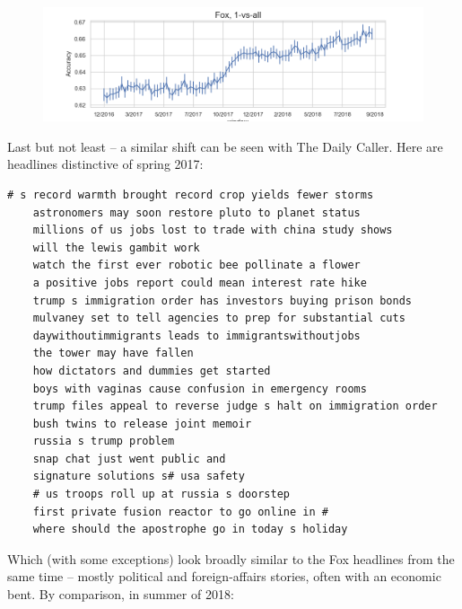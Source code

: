 \documentclass{scrartcl}
\begin{document}
\begin{figure}[H]
  \centering
  \includegraphics[width=\textwidth]{figures/ts-ova-fox.png}
\end{figure}

Last but not least -- a similar shift can be seen with The Daily Caller. Here are headlines distinctive of spring 2017:

\begin{lstlisting}[basicstyle=\tiny\hlfont]
    # s record warmth brought record crop yields fewer storms
    astronomers may soon restore pluto to planet status
    millions of us jobs lost to trade with china study shows
    will the lewis gambit work
    watch the first ever robotic bee pollinate a flower
    a positive jobs report could mean interest rate hike
    trump s immigration order has investors buying prison bonds
    mulvaney set to tell agencies to prep for substantial cuts
    daywithoutimmigrants leads to immigrantswithoutjobs
    the tower may have fallen
    how dictators and dummies get started
    boys with vaginas cause confusion in emergency rooms
    trump files appeal to reverse judge s halt on immigration order
    bush twins to release joint memoir
    russia s trump problem
    snap chat just went public and
    signature solutions s# usa safety
    # us troops roll up at russia s doorstep
    first private fusion reactor to go online in #
    where should the apostrophe go in today s holiday
\end{lstlisting}

Which (with some exceptions) look broadly similar to the Fox headlines from the same time -- mostly political and foreign-affairs stories, often with an economic bent. By comparison, in summer of 2018:
\end{document}
